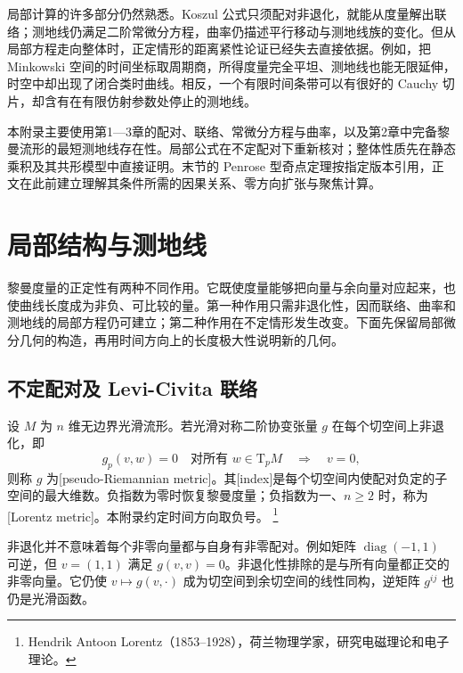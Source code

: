 \ProseParagraphBreak
局部计算的许多部分仍然熟悉。Koszul 公式只须配对非退化，就能从度量解出联络；测地线仍满足二阶常微分方程，曲率仍描述平行移动与测地线族的变化。但从局部方程走向整体时，正定情形的距离紧性论证已经失去直接依据。例如，把 Minkowski 空间的时间坐标取周期商，所得度量完全平坦、测地线也能无限延伸，时空中却出现了闭合类时曲线。相反，一个有限时间条带可以有很好的 Cauchy 切片，却含有在有限仿射参数处停止的测地线。

\ProseParagraphBreak
本附录主要使用第1—3章的配对、联络、常微分方程与曲率，以及第2章中完备黎曼流形的最短测地线存在性。局部公式在不定配对下重新核对；整体性质先在静态乘积及其共形模型中直接证明。末节的 Penrose 型奇点定理按指定版本引用，正文在此前建立理解其条件所需的因果关系、零方向扩张与聚焦计算。

\section{局部结构与测地线}
\label{g3:sec:A01}

黎曼度量的正定性有两种不同作用。它既使度量能够把向量与余向量对应起来，也使曲线长度成为非负、可比较的量。第一种作用只需非退化性，因而联络、曲率和测地线的局部方程仍可建立；第二种作用在不定情形发生改变。下面先保留局部微分几何的构造，再用时间方向上的长度极大性说明新的几何。

\subsection{不定配对及 Levi-Civita 联络}
\label{g3:subsec:A01:01}

\begin{definition}\label{g3:def:A-pseudo-riemannian-metric}
	设 \(M\) 为 \(n\) 维无边界光滑流形。若光滑对称二阶协变张量 \(g\) 在每个切空间上非退化，即
	\[
		g_p(v,w)=0\quad\text{对所有 }w\in\mathrm T_pM
		\quad\Longrightarrow\quad v=0,
	\]
	则称 \(g\) 为[pseudo-Riemannian metric]。其[index]是每个切空间内使配对负定的子空间的最大维数。负指数为零时恢复黎曼度量；负指数为一、\(n\ge2\) 时，称为[Lorentz metric]。本附录约定时间方向取负号。%
	\footnote{Hendrik Antoon Lorentz（1853--1928），荷兰物理学家，研究电磁理论和电子理论。}
\end{definition}

非退化并不意味着每个非零向量都与自身有非零配对。例如矩阵 \(\operatorname{diag}(-1,1)\) 可逆，但 \(v=(1,1)\) 满足 \(g(v,v)=0\)。非退化性排除的是与所有向量都正交的非零向量。它仍使
\(v\mapsto g(v,\cdot)\) 成为切空间到余切空间的线性同构，逆矩阵 \(g^{ij}\) 也仍是光滑函数。

